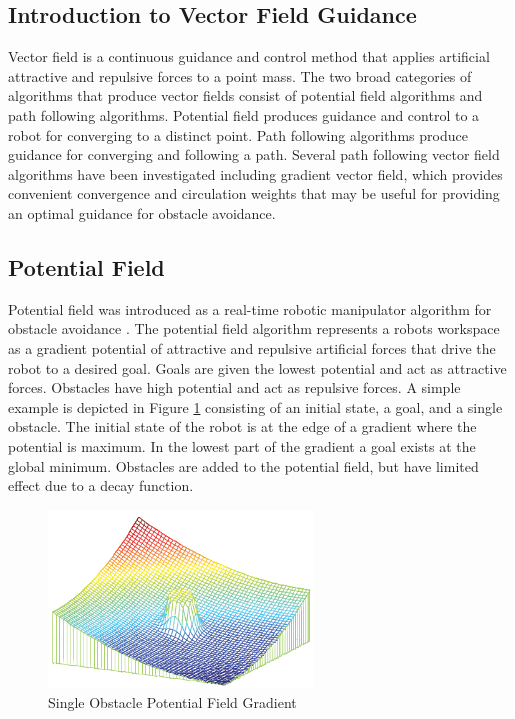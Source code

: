 \documentclass[numbered,pdftex]{ohio-etd}
\begin{document}
\subsection{Introduction to Vector Field Guidance}
Vector field is a continuous guidance and control method that applies artificial attractive and repulsive forces to a point mass. The two broad categories of algorithms that produce vector fields consist of potential field algorithms and path following algorithms. Potential field produces guidance and control to a robot for converging to a distinct point. Path following algorithms produce guidance for converging and following a path. Several path following vector field algorithms have been investigated including gradient vector field, which provides convenient convergence and circulation weights that may be useful for providing an optimal guidance for obstacle avoidance. 


\subsection{Potential Field}

Potential field was introduced as a real-time robotic manipulator algorithm for obstacle avoidance \cite{khatib_real-time_1986}. The potential field algorithm represents a robots workspace as a gradient potential of attractive and repulsive artificial forces that drive the robot to a desired goal. Goals are given the lowest potential and act as attractive forces. Obstacles have high potential and act as repulsive forces. A simple example is depicted in Figure \ref{fig:pfobstacle} consisting of an initial state, a goal, and a single obstacle. The initial state of the robot is at the edge of a gradient where the potential is maximum. In the lowest part of the gradient a goal exists at the global minimum. Obstacles are added to the potential field, but have limited effect due to a decay function.

\begin{figure}[h!]
	\centering
	\includegraphics[width=7cm]{PaperFigures/pfObstacle}
	\caption{Single Obstacle Potential Field Gradient \cite{liu_virtual-waypoint_2016}}
	\label{fig:pfobstacle}
\end{figure}
\end{document}
